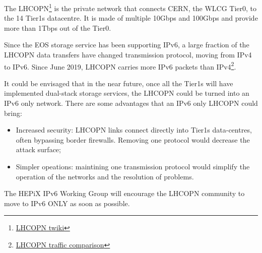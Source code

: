 
The LHCOPN\footnote{\href{https://twiki.cern.ch/twiki/bin/view/LHCOPN/WebHome}{LHCOPN twiki}} is the private network that connects CERN, the WLCG Tier0, to the 14 Tier1s datacentre. It is made of multiple 10Gbps and 100Gbps and provide more than 1Tbps out of the Tier0.

Since the EOS storage service has been supporting IPv6, a large fraction of the LHCOPN data transfers have changed transmission protocol, moving from IPv4 to IPv6. Since June 2019, LHCOPN carries more IPv6 packets than IPv4\footnote{\href{https://twiki.cern.ch/twiki/bin/view/LHCOPN/LHCOPNEv4v6Traffic}{LHCOPN traffic comparison}}. 

It could be envisaged that in the near future, once all the Tier1s will have implemented dual-stack storage services, the LHCOPN could be turned into an IPv6 only network. There are some advantages that an IPv6 only LHCOPN could bring:
\begin{itemize}
  \item Increased security: LHCOPN links connect directly into Tier1s data-centres, often bypassing border firewalls. Removing one protocol would decrease the attack surface;
  \item Simpler opeations: maintining one transmission protocol would simplify the operation of the networks and the resolution of problems.
\end{itemize}

The HEPiX IPv6 Working Group will encourage the LHCOPN community to move to IPv6 ONLY as soon as possible.





